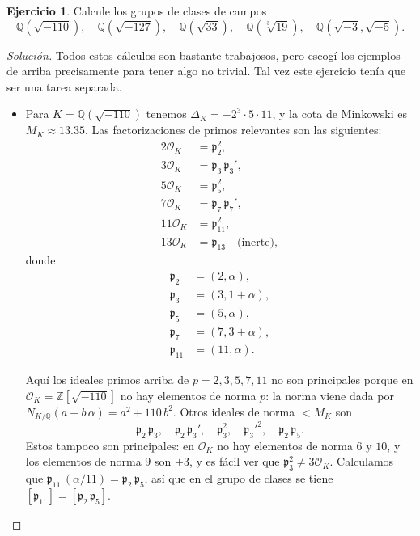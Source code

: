 \documentclass{article}
\newcounter{tarea}
\theoremstyle{definition}
\newtheorem{ejercicio}{Ejercicio}[tarea]
\newenvironment{solucion}{\begin{proof}[Solución]}{\end{proof}}
\newcommand{\ZZ}{\mathbb{Z}}
\newcommand{\QQ}{\mathbb{Q}}
\renewcommand{\O}{\mathcal{O}}
\begin{document}
\begin{ejercicio}
  Calcule los grupos de clases de campos
  \[ \QQ (\sqrt{-110}), \quad
     \QQ (\sqrt{-127}), \quad
     \QQ (\sqrt{33}), \quad
     \QQ (\sqrt[3]{19}), \quad
     \QQ (\sqrt{-3}, \sqrt{-5}). \]

  \ifdefined\solutions
  \begin{solucion}
    Todos estos cálculos son bastante trabajosos, pero escogí los ejemplos de
    arriba precisamente para tener algo no trivial. Tal vez este ejercicio tenía
    que ser una tarea separada.

    \begin{itemize}
    \item Para $K = \QQ (\sqrt{-110})$ tenemos $\Delta_K = -2^3\cdot 5\cdot 11$,
      y la cota de Minkowski es $M_K \approx 13.35$. Las factorizaciones de
      primos relevantes son las siguientes:
      \begin{align*}
        2\O_K & = \mathfrak{p}_2^2, \\
        3\O_K & = \mathfrak{p}_3\,\mathfrak{p}_3', \\
        5\O_K & = \mathfrak{p}_5^2, \\
        7\O_K & = \mathfrak{p}_7\,\mathfrak{p}_7', \\
        11\O_K & = \mathfrak{p}_{11}^2, \\
        13\O_K & = \mathfrak{p}_{13} \quad \text{(inerte)},
      \end{align*}
      donde
      \begin{align*}
        \mathfrak{p}_2 & = (2, \alpha), \\
        \mathfrak{p}_3 & = (3, 1 + \alpha), \\
        \mathfrak{p}_5 & = (5, \alpha), \\
        \mathfrak{p}_7 & = (7, 3 + \alpha), \\
        \mathfrak{p}_{11} & = (11, \alpha).
      \end{align*}

      Aquí los ideales primos arriba de $p = 2,3,5,7,11$ no son principales
      porque en $\O_K = \ZZ [\sqrt{-110}]$ no hay elementos de norma $p$:
      la norma viene dada por
      $N_{K/\QQ} (a + b\,\alpha) = a^2 + 110\,b^2$. Otros ideales de norma
      $< M_K$ son
      \[ \mathfrak{p}_2\,\mathfrak{p}_3, \quad
        \mathfrak{p}_2\,\mathfrak{p}_3', \quad
        \mathfrak{p}_3^2, \quad \mathfrak{p}_3'^2, \quad
        \mathfrak{p}_2\,\mathfrak{p}_5. \]
      Estos tampoco son principales: en $\O_K$ no hay elementos de norma
      $6$ y $10$, y los elementos de norma $9$ son $\pm 3$, y es fácil ver que
      $\mathfrak{p}_3^2 \ne 3\O_K$.
      Calculamos que
      $\mathfrak{p}_{11}\,(\alpha/11) = \mathfrak{p}_2\,\mathfrak{p}_5$,
      así que en el grupo de clases se tiene
      $[\mathfrak{p}_{11}] = [\mathfrak{p}_2\,\mathfrak{p}_5]$.


\end{itemize}
\end{solucion}
\end{ejercicio}
\end{document}
